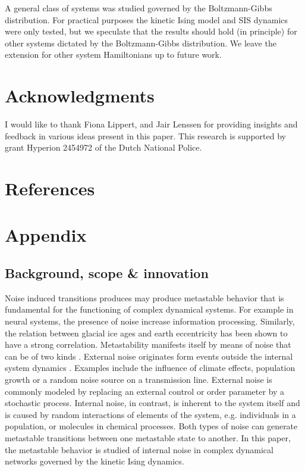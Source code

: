 \documentclass[a4paper, 11pt, twocolumn]{article}
\begin{document}
A  general class  of  systems was  studied  governed by  the
Boltzmann-Gibbs  distribution.  For practical  purposes  the
kinetic Ising model  and SIS dynamics were  only tested, but
we speculate that the results should hold (in principle) for
other systems dictated  by the Boltzmann-Gibbs distribution.
We leave the  extension for other system  Hamiltonians up to
future work.
\section{Acknowledgments}
\label{sec:orgf30530a}
I would  like to  thank Fiona Lippert,  and Jair  Lenssen for
providing insights and feedback  in various ideas present in
this  paper. This  research is  supported by  grant Hyperion
2454972 of the Dutch National Police.

\section{References}
\label{sec:org26fe258}
\printbibliography[heading=none]

\section{Appendix}
\label{sec:org854db8e}
\subsection{Background, scope \& innovation}
\label{sec:orgd888f8c}
Noise  induced transitions  produces may  produce metastable
behavior that is fundamental  for the functioning of complex
dynamical  systems.  For  example  in  neural  systems,  the
presence   of   noise   increase   information   processing.
Similarly, the  relation between glacial ice  ages and earth
eccentricity has  been shown  to have a  strong correlation.
Metastability manifests itself by means of noise that can be
of two  kinds \cite{Forgoston2018}. External  noise originates
form   events   outside   the   internal   system   dynamics
\cite{Calim2021,Czaplicka2013a}.    Examples    include    the
influence of climate effects,  population growth or a random
noise  source  on a  transmission  line.  External noise  is
commonly modeled  by replacing an external  control or order
parameter  by  a  stochastic  process.  Internal  noise,  in
contrast, is inherent to the  system itself and is caused by
random  interactions   of  elements  of  the   system,  e.g.
individuals  in  a  population,  or  molecules  in  chemical
processes.  Both  types  of noise  can  generate  metastable
transitions between one metastable state to another. In this
paper, the metastable behavior is studied of internal noise
in complex dynamical networks  governed by the kinetic Ising
dynamics.
\end{document}
